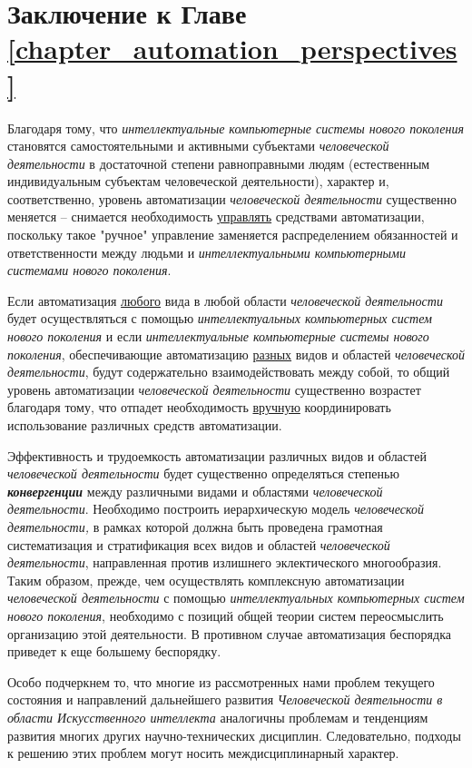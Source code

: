 \section*{Заключение к Главе \ref{chapter_automation_perspectives}}

Благодаря тому, что \textit{интеллектуальные компьютерные системы нового поколения} становятся самостоятельными и активными субъектами \textit{человеческой деятельности} в достаточной степени равноправными людям (естественным индивидуальным субъектам человеческой деятельности), характер и, соответственно, уровень автоматизации \textit{человеческой деятельности} существенно меняется -- снимается необходимость \underline{управлять} средствами автоматизации, поскольку такое "ручное"{} управление заменяется распределением обязанностей и ответственности между людьми и \textit{интеллектуальными компьютерными системами нового поколения}.

Если автоматизация \underline{любого} вида в любой области \textit{человеческой деятельности} будет осуществляться с помощью \textit{интеллектуальных компьютерных систем нового поколения} и если \textit{интеллектуальные компьютерные системы нового поколения}, обеспечивающие автоматизацию \underline{разных} видов и областей \textit{человеческой деятельности}, будут содержательно взаимодействовать между собой, то общий уровень автоматизации \textit{человеческой деятельности} существенно возрастет благодаря тому, что отпадет необходимость \underline{вручную} координировать использование различных средств автоматизации.

Эффективность и трудоемкость автоматизации различных видов и областей \textit{человеческой деятельности} будет существенно определяться степенью \textbf{\textit{конвергенции}} между различными видами и областями \textit{человеческой деятельности}. Необходимо построить иерархическую модель \textit{человеческой деятельности,} в рамках которой должна быть проведена грамотная систематизация и стратификация всех видов и областей \textit{человеческой деятельности}, направленная против излишнего эклектического многообразия. Таким образом, прежде, чем осуществлять комплексную автоматизации \textit{человеческой деятельности} с помощью \textit{интеллектуальных компьютерных систем} \textit{нового поколения}, необходимо с позиций общей теории систем переосмыслить организацию этой деятельности. В противном случае автоматизация беспорядка приведет к еще большему беспорядку.

Особо подчеркнем то, что многие из рассмотренных нами проблем текущего состояния и направлений дальнейшего развития \textit{Человеческой деятельности в области Искусственного интеллекта} аналогичны проблемам и тенденциям развития многих других научно-технических дисциплин. Следовательно, подходы к решению этих проблем могут носить междисциплинарный характер.

